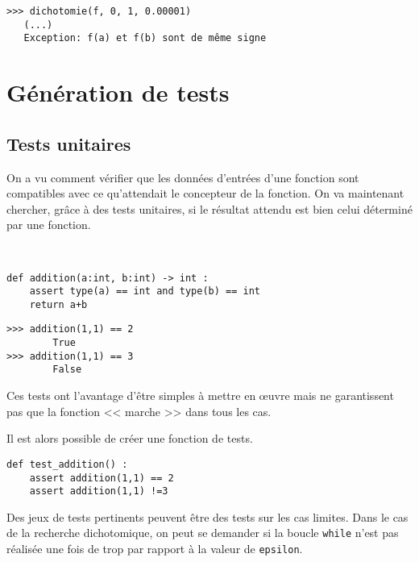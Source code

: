 \begin{lstlisting}
>>> dichotomie(f, 0, 1, 0.00001)
   (...)
   Exception: f(a) et f(b) sont de même signe
\end{lstlisting}

\section{Génération de tests}

\subsection{Tests unitaires}

On a vu comment vérifier que les données d'entrées d'une fonction sont compatibles avec ce qu'attendait le concepteur de la fonction. On va maintenant chercher, grâce à des tests unitaires, si le résultat attendu est bien celui déterminé par une fonction. 
\begin{exemple}~\\
\begin{minipage}[c]{.5\linewidth}
\begin{lstlisting}
def addition(a:int, b:int) -> int : 
    assert type(a) == int and type(b) == int
    return a+b
\end{lstlisting}
\end{minipage} \hfill
\begin{minipage}[c]{.45\linewidth}
\begin{lstlisting}
>>> addition(1,1) == 2
        True
>>> addition(1,1) == 3
        False
\end{lstlisting}
\end{minipage} 

\end{exemple}

Ces tests ont l'avantage d'être simples à mettre en \oe{}uvre mais ne garantissent pas que la fonction << marche >> dans tous les cas. 

Il est alors possible de créer une fonction de tests. 
\begin{lstlisting}
def test_addition() :
    assert addition(1,1) == 2
    assert addition(1,1) !=3
\end{lstlisting}

Des jeux de tests pertinents peuvent être des tests sur les cas limites. 
Dans le cas de la recherche dichotomique, on peut se demander si la boucle \texttt{while} n'est pas réalisée une fois de trop par rapport à la valeur de \texttt{epsilon}.

